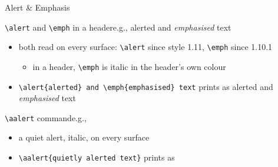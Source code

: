 \documentclass[presentation,cesena,apice]{beamer}\mode<presentation>{\usetheme{AMSBolognaFC}}
\begin{document}
\begin{frame}[c,fragile]{Alert \& Emphasis}
%
\begin{block}{\texttt{\textbackslash{}alert} and \texttt{\textbackslash{}emph} in a header\textemdash{}e.g., \alert{alerted} and \emph{emphasised} text}
\begin{itemize}
	\item both read on every surface: \texttt{\textbackslash{}alert} since style 1.11, \texttt{\textbackslash{}emph} since 1.10.1
	\begin{itemize}
		\item in a header, \texttt{\textbackslash{}emph} is italic in the header's own colour
	\end{itemize}
	\item[e.g.] \verb|\alert{alerted} and \emph{emphasised} text| prints as \alert{alerted} and \emph{emphasised} text
\end{itemize}
\end{block}
%
\begin{block}{\texttt{\textbackslash{}aalert} command\textemdash{}e.g., }
\begin{itemize}
	\item a quiet alert, italic, on every surface
	\item[e.g.] \verb|| prints as \aalert{quietly alerted text}
\end{itemize}
\end{block}
%
\end{frame}
\end{document}
